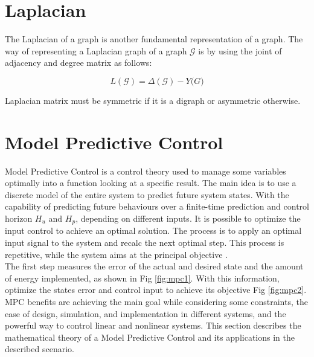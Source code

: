 \section*{Laplacian}

The Laplacian of a graph is another fundamental representation of a graph. The way of representing a Laplacian graph of a graph $\mathcal{G}$ is by using the joint of adjacency and degree matrix as follows:

\begin{equation}
    L(\mathcal{G}) = \Delta (\mathcal{G}) - Y\mathcal(G)
\end{equation}

Laplacian matrix must be symmetric if it is a digraph or asymmetric otherwise. 
















\section{Model Predictive Control}
Model Predictive Control is a control theory used to manage some variables optimally into a function looking at a specific result. The main idea is to use a discrete model of the entire system to predict future system states. With the capability of predicting future behaviours over a finite-time prediction and control horizon $H_u$ and $H_p$, depending on different inputs. It is possible to optimize the input control to achieve an optimal solution. The process is to apply an optimal input signal to the system and recalc the next optimal step. This process is repetitive, while the system aims at the principal objective \cite{3t_sequential}. 
\\

The first step measures the error of the actual and desired state and the amount of energy implemented, as shown in Fig  \ref{fig:mpc1}. With this information, optimize the states error and control input to achieve its objective Fig \ref{fig:mpc2}. MPC benefits are achieving the main goal while considering some constraints, the ease of design, simulation, and implementation in different systems, and the powerful way to control linear and nonlinear systems. This section describes the mathematical theory of a Model Predictive Control and its applications in the described scenario.


